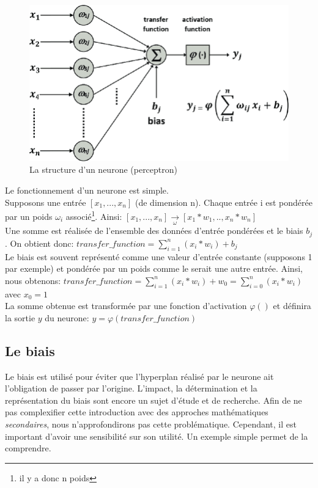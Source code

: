 \begin{figure}
    \centering
    \includegraphics[scale=0.3]{./tex/fondamentaux/perceptron.png}
    \caption{La structure d'un neurone (perceptron)}
    \label{perceptron}
\end{figure}

\noindent Le fonctionnement d'un neurone est simple. \\
Supposons une entrée $[x_1,...,x_n]$ (de dimension n). Chaque entrée i est pondérée par un poids $\omega_i$ associé\footnote{il y a donc n poids}. Ainsi:
$[x_1,...,x_n]\underset{\omega}{\longrightarrow}[x_1*w_1,..,x_n*w_n]$\\

\noindent Une somme est réalisée de l'ensemble des données d'entrée pondérées et le biais $b_j$. On obtient donc: $transfer\_function=\sum_{i=1}^n (x_i*w_i)+b_j$\\
Le biais est souvent représenté comme une valeur d'entrée constante (supposons 1 par exemple) et pondérée par un poids comme le serait une autre entrée. Ainsi, nous obtenons: $transfer\_function=\sum_{i=1}^n (x_i*w_i) + w_0=\sum_{i=0}^n (x_i*w_i)$ avec $x_0=1$\\

\noindent La somme obtenue est transformée par une fonction d'activation $\varphi()$ et définira la sortie $y$ du neurone: $y=\varphi(transfer\_function)$

\subsection{Le biais}
Le biais est utilisé pour éviter que l'hyperplan réalisé par le neurone ait l'obligation de passer par l'origine. L'impact, la détermination et la représentation du biais sont encore un sujet d'étude et de recherche. Afin de ne pas complexifier cette introduction avec des approches mathématiques \textit{secondaires}, nous n'approfondirons pas cette problématique. Cependant, il est important d'avoir une sensibilité sur son utilité. Un exemple simple permet de la comprendre.\\

